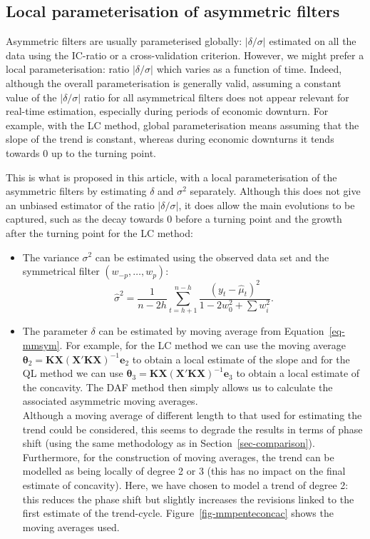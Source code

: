 \documentclass[
]{article}
\providecommand{\tightlist}{%
  \setlength{\itemsep}{0pt}\setlength{\parskip}{0pt}}\usepackage{longtable,booktabs,array}
\newcommand\1{\mathds{1}}
\begin{document}
\subsection{Local parameterisation of asymmetric
filters}\label{sec-localic}

Asymmetric filters are usually parameterised globally:
\(\lvert\delta/\sigma\rvert\) estimated on all the data using the
IC-ratio or a cross-validation criterion. However, we might prefer a
local parameterisation: ratio \(\lvert\delta/\sigma\rvert\) which varies
as a function of time. Indeed, although the overall parameterisation is
generally valid, assuming a constant value of the
\(\lvert\delta/\sigma\rvert\) ratio for all asymmetrical filters does
not appear relevant for real-time estimation, especially during periods
of economic downturn. For example, with the LC method, global
parameterisation means assuming that the slope of the trend is constant,
whereas during economic downturns it tends towards 0 up to the turning
point.

This is what is proposed in this article, with a local parameterisation
of the asymmetric filters by estimating \(\delta\) and \(\sigma^2\)
separately. Although this does not give an unbiased estimator of the
ratio \(\lvert\delta/\sigma\rvert\), it does allow the main evolutions
to be captured, such as the decay towards 0 before a turning point and
the growth after the turning point for the LC method:

\begin{itemize}
\tightlist
\item
  The variance \(\sigma^2\) can be estimated using the observed data set
  and the symmetrical filter \((w_{-p},\dots,w_p)\): \[
  \hat\sigma^2=\frac{1}{n-2h}\sum_{t=h+1}^{n-h}\frac{(y_t-\hat \mu_t)^2}{1-2w_0^2+\sum w_i^2}.
  \]
\item
  The parameter \(\delta\) can be estimated by moving average from
  Equation~\ref{eq-mmsym}. For example, for the LC method we can use the
  moving average
  \(\boldsymbol \theta_2=\boldsymbol K\boldsymbol X(\boldsymbol X'\boldsymbol K\boldsymbol X)^{-1}\boldsymbol e_{2}\)
  to obtain a local estimate of the slope and for the QL method we can
  use
  \(\boldsymbol \theta_3=\boldsymbol K\boldsymbol X(\boldsymbol X'\boldsymbol K\boldsymbol X)^{-1}\boldsymbol e_{3}\)
  to obtain a local estimate of the concavity. The DAF method then
  simply allows us to calculate the associated asymmetric moving
  averages.\\
  Although a moving average of different length to that used for
  estimating the trend could be considered, this seems to degrade the
  results in terms of phase shift (using the same methodology as in
  Section~\ref{sec-comparison}). Furthermore, for the construction of
  moving averages, the trend can be modelled as being locally of degree
  2 or 3 (this has no impact on the final estimate of concavity). Here,
  we have chosen to model a trend of degree 2: this reduces the phase
  shift but slightly increases the revisions linked to the first
  estimate of the trend-cycle. Figure~\ref{fig-mmpenteconcac} shows the
  moving averages used.
\end{itemize}
\end{document}
